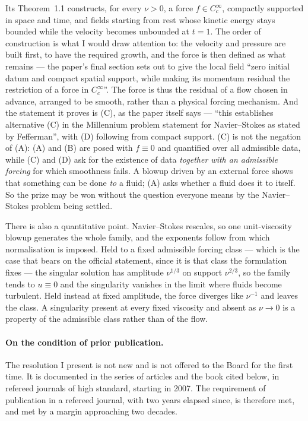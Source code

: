 \documentclass[11pt]{article}
\begin{document}
Its Theorem~1.1 constructs, for every $\nu>0$, a force $f\in C^\infty_c$, compactly supported in space
and time, and fields starting from rest whose kinetic energy stays bounded while the velocity becomes
unbounded at $t=1$. The order of construction is what I would draw attention to: the velocity and
pressure are built first, to have the required growth, and the force is then defined as what remains
--- the paper's final section sets out to give the local field ``zero initial datum and compact spatial
support, while making its momentum residual the restriction of a force in
$C^\infty_c$''. The force is thus the residual of a flow chosen in advance, arranged to be smooth,
rather than a physical forcing mechanism. And the statement it proves is (C), as the paper itself says --- ``this establishes alternative (C) in
the Millennium problem statement for Navier--Stokes as stated by Fefferman'', with (D) following from
compact support. (C) is not the negation of (A): (A) and (B) are posed
with $f\equiv0$ and quantified over all admissible data, while (C) and (D) ask for the existence of data
\emph{together with an admissible forcing} for which smoothness fails. A blowup driven by an external
force shows that something can be done \emph{to} a fluid; (A) asks whether a fluid does it to itself.
So the prize may be won without the question everyone means by the Navier--Stokes problem being
settled.

There is also a quantitative point. Navier--Stokes rescales, so one unit-viscosity blowup generates the
whole family, and the exponents follow from which normalisation is imposed. Held to a fixed admissible
forcing class --- which is the case that bears on the official statement, since it is that class the
formulation fixes --- the singular solution has amplitude $\nu^{1/3}$ on support $\nu^{2/3}$, so the
family tends to $u\equiv0$ and the singularity vanishes in the limit where fluids become turbulent.
Held instead at fixed amplitude, the force diverges like $\nu^{-1}$ and leaves the class. A singularity
present at every fixed viscosity and absent as $\nu\to0$ is a property of the admissible class rather
than of the flow.

\paragraph{On the condition of prior publication.} The resolution I present is not new and is not
offered to the Board for the first time. It is documented in the series of articles and the book cited
below, in refereed journals of high standard, starting in 2007. The requirement of publication in a
refereed journal, with two years elapsed since, is therefore met, and met by a margin approaching two
decades.
\end{document}
